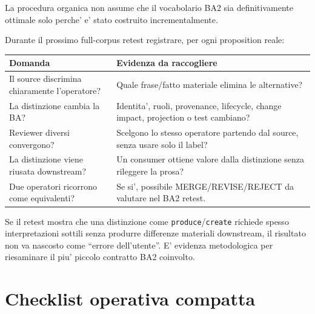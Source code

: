 \documentclass[11pt,a4paper]{article}
\newcommand{\code}[1]{\nolinkurl{#1}}
\begin{document}
La procedura organica non assume che il vocabolario BA2 sia definitivamente ottimale solo perche' e' stato costruito incrementalmente.

Durante il prossimo full-corpus retest registrare, per ogni proposition reale:

\begin{longtable}{L{0.31\textwidth}L{0.57\textwidth}}
\toprule
\textbf{Domanda} & \textbf{Evidenza da raccogliere} \\
\midrule\endhead
Il source discrimina chiaramente l'operatore? & Quale frase/fatto materiale elimina le alternative? \\
La distinzione cambia la BA? & Identita', ruoli, provenance, lifecycle, change impact, projection o test cambiano? \\
Reviewer diversi convergono? & Scelgono lo stesso operatore partendo dal source, senza usare solo il label? \\
La distinzione viene riusata downstream? & Un consumer ottiene valore dalla distinzione senza rileggere la prosa? \\
Due operatori ricorrono come equivalenti? & Se si', possibile MERGE/REVISE/REJECT da valutare nel BA2 retest. \\
\bottomrule
\end{longtable}

\begin{statusopen}
Se il retest mostra che una distinzione come \code{produce}/\code{create} richiede spesso interpretazioni sottili senza produrre differenze materiali downstream, il risultato non va nascosto come ``errore dell'utente''. E' evidenza metodologica per riesaminare il piu' piccolo contratto BA2 coinvolto.
\end{statusopen}

\section{Checklist operativa compatta}
\end{document}
